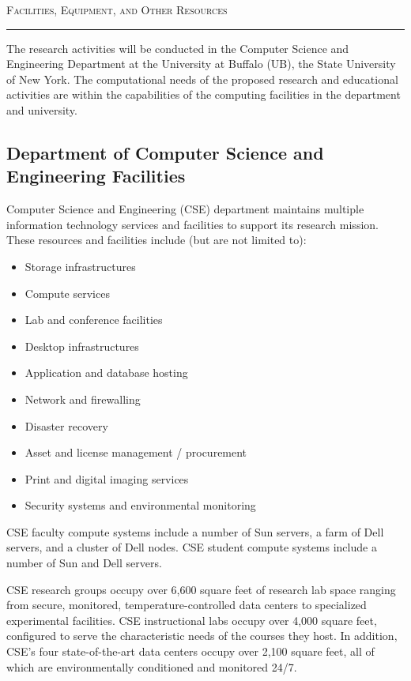 

\usepackage{paralist}



\begin{center}
{\LARGE
\textsc{Facilities, Equipment, and Other Resources}
}
\end{center}
\hrule

\vspace{3mm}

The research activities will be conducted in the Computer Science and
Engineering Department at the University at Buffalo (UB), the State
University of New York. The computational needs of the proposed
research and educational activities are within the capabilities of the
computing facilities in the department and university.

\subsection*{Department of Computer Science and Engineering Facilities}

Computer Science and Engineering (CSE) department maintains multiple
information technology services and facilities to support its research
mission. These resources and facilities include (but are not limited to): 


\begin{itemize}
  \item Storage infrastructures
  \item Compute services
  \item Lab and conference facilities
  \item Desktop infrastructures
  \item Application and database hosting
  \item Network and firewalling
  \item Disaster recovery
  \item Asset and license management / procurement
  \item Print and digital imaging services
  \item Security systems and environmental monitoring 
\end{itemize}

 \noindent
CSE faculty compute systems include a number of Sun servers, a farm of Dell
servers, and a cluster of Dell nodes. CSE student compute systems include a
number of Sun and Dell servers.
 
CSE research groups occupy over 6,600 square feet of research lab space
ranging from secure, monitored, temperature-controlled data centers to
specialized experimental facilities. CSE instructional labs occupy over
4,000 square feet, configured to serve the characteristic needs of the
courses they host. In addition, CSE's four state-of-the-art data centers
occupy over 2,100 square feet, all of which are environmentally conditioned
and monitored 24/7. 

